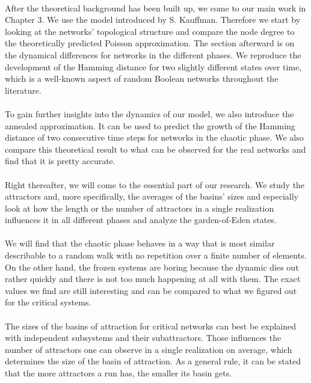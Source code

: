 \paragraph*{}
After the theoretical background has been built up, we come to our main work in Chapter 3. We use the model introduced by S. Kauffman. Therefore we start by looking at the networks' topological structure and compare the node degree to the theoretically predicted Poisson approximation. The section afterward is on the dynamical differences for networks in the different phases. We reproduce the development of the Hamming distance for two slightly different states over time, which is a well-known aspect of random Boolean networks throughout the literature.

\paragraph*{}
To gain further insights into the dynamics of our model, we also introduce the annealed approximation. It can be used to predict the growth of the Hamming distance of two consecutive time steps for networks in the chaotic phase. We also compare this theoretical result to what can be observed for the real networks and find that it is pretty accurate.

\paragraph*{}
Right thereafter, we will come to the essential part of our research. We study the attractors and, more specifically, the averages of the basins' sizes and especially look at how the length or the number of attractors in a single realization influences it in all different phases and analyze the garden-of-Eden states. 

\paragraph*{}
We will find that the chaotic phase behaves in a way that is most similar describable to a random walk with no repetition over a finite number of elements. On the other hand, the frozen systems are boring because the dynamic dies out rather quickly and there is not too much happening at all with them. The exact values we find are still interesting and can be compared to what we figured out for the critical systems.

\paragraph*{}
The sizes of the basins of attraction for critical networks can best be explained with independent subsystems and their subattractors. Those influences the number of attractors one can observe in a single realization on average, which determines the size of the basin of attraction. As a general rule, it can be stated that the more attractors a run has, the smaller its basin gets.

